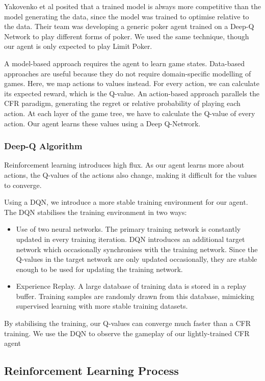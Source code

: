 \documentclass{article}
\begin{document}
Yakovenko et al posited that a trained model is always more competitive than the model generating the data, since the model was trained to optimise relative to the data. Their team was developing a generic poker agent trained on a Deep-Q Network to play different forms of poker. We used the same technique, though our agent is only expected to play Limit Poker.

A model-based approach requires the agent to learn game states. Data-based approaches are useful because they do not require domain-specific modelling of games. Here, we map actions to values instead. For every action, we can calculate its expected reward, which is the Q-value. An action-based approach parallels the CFR paradigm, generating the regret or relative probability of playing each action. At each layer of the game tree, we have to calculate the Q-value of every action. Our agent learns these values using a Deep Q-Network.

\subsubsection{Deep-Q Algorithm}
Reinforcement learning introduces high flux. As our agent learns more about actions, the Q-values of the actions also change, making it difficult for the values to converge. 

Using a DQN, we introduce a more stable training environment for our agent. The DQN stabilises the training environment in two ways:

\begin{itemize}
	\item Use of two neural networks. The primary training network is constantly updated in every training iteration. DQN introduces an additional target network which occasionally synchronises with the training network. Since the Q-values in the target network are only updated occasionally, they are stable enough to be used for updating the training network.
	\item Experience Replay. A large database of training data is stored in a replay buffer. Training samples are randomly drawn from this database, mimicking supervised learning with more stable training datasets.
\end{itemize}

By stabilising the training, our Q-values can converge much faster than a CFR training. We use the DQN to observe the gameplay of our lightly-trained CFR agent

\subsection{Reinforcement Learning Process}
\end{document}
